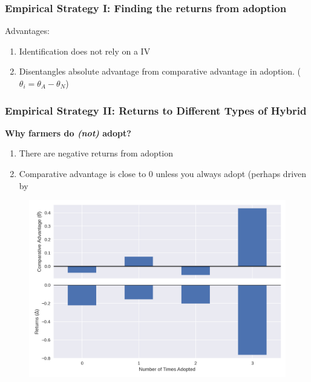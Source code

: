 \documentclass{beamer}
\begin{document}
\begin{frame}
\frametitle{Empirical Strategy I: Finding the returns from adoption}

Advantages:
\begin{enumerate}
    \item Identification does not rely on a IV 
    \item Disentangles absolute advantage from comparative advantage in adoption. ($\theta_i = \theta_A - \theta_N$)
\end{enumerate}




\end{frame}


\begin{frame}
\frametitle{Empirical Strategy II: Returns to Different Types of Hybrid}
\textbf{Why farmers do \textit{(not)} adopt?}

\begin{enumerate}
    \item There are negative returns from adoption
    \item Comparative advantage is close to 0 unless you always adopt (perhaps driven by 
\end{enumerate}

\begin{figure}
    \centering
    \label{fig:traj_sum}
    \includegraphics[scale=.4]{results/figures/traj_sum.png}
\end{figure}
 
\end{frame}
\end{document}
